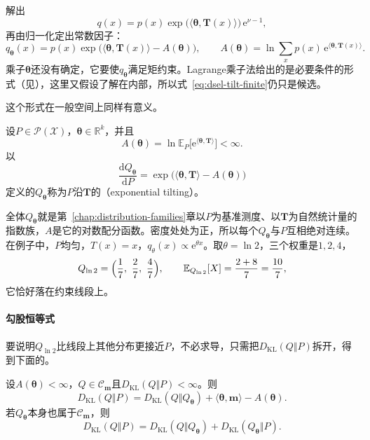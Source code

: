 解出
\[
 q(x)=p(x)\exp\bigl(\langle\bm{\theta},\bm{T}(x)\rangle\bigr)\,\mathrm{e}^{\nu-1} ,
\]
再由归一化定出常数因子：
\begin{equation}
 q_{\bm{\theta}}(x)=p(x)\exp\bigl(\langle\bm{\theta},\bm{T}(x)\rangle-A(\bm{\theta})\bigr),\qquad A(\bm{\theta})=\ln\sum_xp(x)\,\mathrm{e}^{\langle\bm{\theta},\bm{T}(x)\rangle} .
 \label{eq:dsel-tilt-finite}
\end{equation}
乘子$\bm{\theta}$还没有确定，它要使$q_{\bm{\theta}}$满足矩约束。Lagrange乘子法给出的是必要条件的形式（见），这里又假设了解在内部，所以式~\eqref{eq:dsel-tilt-finite}仍只是候选。

这个形式在一般空间上同样有意义。

\begin{definition}[指数倾斜]
\label{def:dsel-tilt}
设$P\in\mathcal{P}(\mathcal{X})$，$\bm{\theta}\in\mathbb{R}^{k}$，并且
\begin{equation}
 A(\bm{\theta})=\ln\mathbb{E}_{P}\bigl[\mathrm{e}^{\langle\bm{\theta},\bm{T}\rangle}\bigr]<\infty .
 \label{eq:dsel-tilt-partition}
\end{equation}
以
\begin{equation}
 \frac{\mathrm{d}Q_{\bm{\theta}}}{\mathrm{d}P}=\exp\bigl(\langle\bm{\theta},\bm{T}\rangle-A(\bm{\theta})\bigr)
 \label{eq:dsel-tilt}
\end{equation}
定义的$Q_{\bm{\theta}}$称为$P$沿$\bm{T}$的（exponential tilting）。
\end{definition}

全体$Q_{\bm{\theta}}$就是第~\ref{chap:distribution-families}章以$P$为基准测度、以$\bm{T}$为自然统计量的指数族，$A$是它的对数配分函数。密度处处为正，所以每个$Q_{\bm{\theta}}$与$P$互相绝对连续。在例子中，$P$均匀，$T(x)=x$，$q_\theta(x)\propto\mathrm{e}^{\theta x}$。取$\theta=\ln2$，三个权重是$1,2,4$，
\[
 Q_{\ln2}=\Bigl(\frac17,\ \frac27,\ \frac47\Bigr),\qquad\mathbb{E}_{Q_{\ln2}}[X]=\frac{2+8}{7}=\frac{10}{7},
\]
它恰好落在约束线段上。

\paragraph{勾股恒等式}
要说明$Q_{\ln2}$比线段上其他分布更接近$P$，不必求导，只需把$D_{\mathrm{KL}}(Q\Vert P)$拆开，得到下面的。

\begin{lemma}[勾股恒等式]
\label{lem:dsel-pythagoras}
设$A(\bm{\theta})<\infty$，$Q\in\mathcal{C}_{\bm{m}}$且$D_{\mathrm{KL}}(Q\Vert P)<\infty$。则
\begin{equation}
 D_{\mathrm{KL}}(Q\Vert P)=D_{\mathrm{KL}}(Q\Vert Q_{\bm{\theta}})+\langle\bm{\theta},\bm{m}\rangle-A(\bm{\theta}) .
 \label{eq:dsel-pythagoras-general}
\end{equation}
若$Q_{\bm{\theta}}$本身也属于$\mathcal{C}_{\bm{m}}$，则
\begin{equation}
 D_{\mathrm{KL}}(Q\Vert P)=D_{\mathrm{KL}}(Q\Vert Q_{\bm{\theta}})+D_{\mathrm{KL}}(Q_{\bm{\theta}}\Vert P) .
 \label{eq:dsel-pythagoras}
\end{equation}
\end{lemma}

